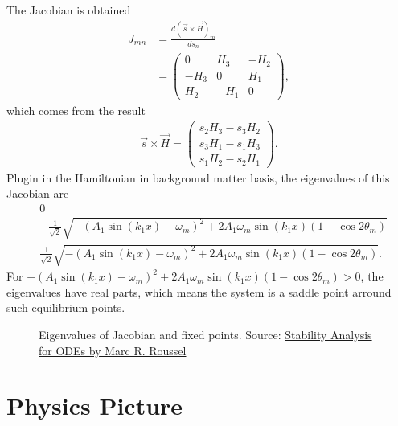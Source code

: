 \documentclass[letterpaper,12pt,english]{sphinxmanual}
\begin{document}
The Jacobian is obtained
\begin{equation*}
\begin{split}J_{mn} & = \frac{d (\vec s\times \vec H)_m}{ds_n} \\
& = \begin{pmatrix}
0 & H_3 & -H_2\\
-H_3 &  0 & H_1 \\
H_2 & -H_1 & 0
\end{pmatrix},\end{split}
\end{equation*}
which comes from the result
\begin{equation*}
\begin{split}\vec s\times \vec H = \begin{pmatrix}
s_2 H_3 - s_3 H_2 \\
s_3 H_1 - s_1 H_3 \\
s_1 H_2 - s_2 H_1
\end{pmatrix}.\end{split}
\end{equation*}
Plugin in the Hamiltonian in background matter basis, the eigenvalues of this Jacobian are
\begin{equation*}
\begin{split}& 0 \\
& -\frac{1}{\sqrt{2}} \sqrt{ - ( A_1 \sin (k_1 x) -\omega_m )^2 + 2 A_1 \omega_m \sin (k_1 x) (1 - \cos 2\theta_m) }\\
& \frac{1}{\sqrt{2}} \sqrt{ - ( A_1 \sin (k_1 x) -\omega_m )^2 + 2 A_1 \omega_m \sin (k_1 x) (1 - \cos 2\theta_m) }.\end{split}
\end{equation*}
For \(- ( A_1 \sin (k_1 x) -\omega_m )^2 + 2 A_1 \omega_m \sin (k_1 x) (1 - \cos 2\theta_m) > 0\), the eigenvalues have real parts, which means the system is a saddle point arround such equilibrium points.
\begin{figure}[htbp]
\centering
\capstart

\noindent{}
\caption{Eigenvalues of Jacobian and fixed points. Source: \href{http://people.uleth.ca/~roussel/nld/stability.pdf}{Stability Analysis for ODEs by Marc R. Roussel}}\label{\detokenize{matter-stimulated/flavor-isospin-matter:id1}}\end{figure}


\section{Physics Picture}
\label{\detokenize{matter-stimulated/picture::doc}}\label{\detokenize{matter-stimulated/picture:physics-picture}}
\end{document}
